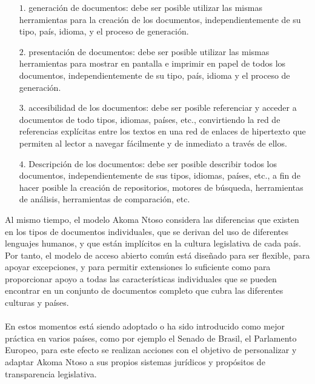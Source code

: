 \documentclass[conference]{IEEEtran}
\begin{document}
 \begin{itemize}  
   \item[$1.$]	generación de documentos: debe ser posible utilizar las mismas herramientas para la creación de los documentos, independientemente de su tipo, país, idioma, y el proceso de generación.
   \item[$2.$]	presentación de documentos: debe ser posible utilizar las mismas herramientas para mostrar en pantalla e imprimir en papel de todos los documentos, independientemente de su tipo, país, idioma y el proceso de generación.
   \item[$3.$]	accesibilidad de los documentos: debe ser posible referenciar y acceder a documentos de todo tipos, idiomas, países, etc., convirtiendo la red de referencias explícitas entre los textos en una red de enlaces de hipertexto que permiten al lector a navegar fácilmente y de inmediato a través de ellos.
   \item[$4.$]	Descripción de los documentos: debe ser posible describir todos los documentos, independientemente de sus tipos, idiomas, países, etc., a fin de hacer posible la creación de repositorios, motores de búsqueda, herramientas de análisis, herramientas de comparación, etc.\\
 \end{itemize}    
   Al mismo tiempo, el modelo Akoma Ntoso considera las diferencias que existen en los tipos de documentos individuales, que se derivan del uso de diferentes lenguajes humanos, y que están implícitos en la cultura legislativa de cada país. Por tanto, el modelo de acceso abierto común está diseñado para ser flexible, para apoyar excepciones, y para permitir extensiones lo suficiente como para proporcionar apoyo a todas las características individuales que se pueden encontrar en un conjunto de documentos completo que cubra las diferentes culturas y países.\\ \\
   En estos momentos está siendo adoptado o ha sido introducido como mejor práctica en varios países, como por ejemplo el Senado de Brasil, el Parlamento Europeo, para este efecto se realizan acciones con el objetivo de personalizar y adaptar Akoma Ntoso a sus propios sistemas jurídicos y propósitos de transparencia legislativa. 
   
   
\end{document}
